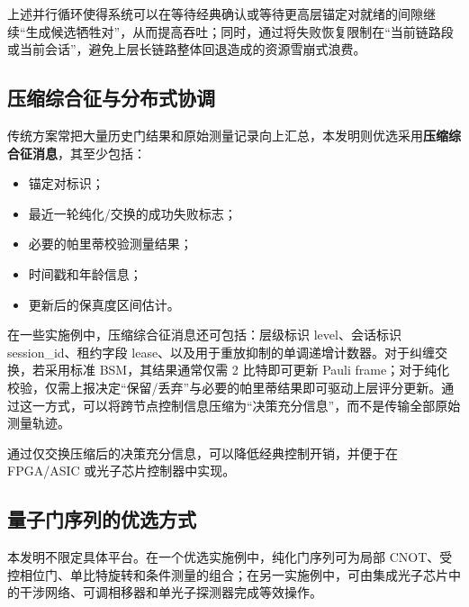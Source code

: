 \documentclass[12pt,a4paper]{article}
\begin{document}
上述并行循环使得系统可以在等待经典确认或等待更高层锚定对就绪的间隙继续“生成候选牺牲对”，从而提高吞吐；同时，通过将失败恢复限制在“当前链路段或当前会话”，避免上层长链路整体回退造成的资源雪崩式浪费。

\subsection{压缩综合征与分布式协调}

传统方案常把大量历史门结果和原始测量记录向上汇总，本发明则优选采用\textbf{压缩综合征消息}，其至少包括：
\begin{itemize}[noitemsep]
    \item 锚定对标识；
    \item 最近一轮纯化/交换的成功失败标志；
    \item 必要的帕里蒂校验测量结果；
    \item 时间戳和年龄信息；
    \item 更新后的保真度区间估计。
\end{itemize}

在一些实施例中，压缩综合征消息还可包括：层级标识 level、会话标识 session\_id、租约字段 lease、以及用于重放抑制的单调递增计数器。对于纠缠交换，若采用标准 BSM，其结果通常仅需 2 比特即可更新 Pauli frame；对于纯化校验，仅需上报决定“保留/丢弃”与必要的帕里蒂结果即可驱动上层评分更新。通过这一方式，可以将跨节点控制信息压缩为“决策充分信息”，而不是传输全部原始测量轨迹。

通过仅交换压缩后的决策充分信息，可以降低经典控制开销，并便于在 FPGA/ASIC 或光子芯片控制器中实现。

\subsection{量子门序列的优选方式}

本发明不限定具体平台。在一个优选实施例中，纯化门序列可为局部 CNOT、受控相位门、单比特旋转和条件测量的组合；在另一实施例中，可由集成光子芯片中的干涉网络、可调相移器和单光子探测器完成等效操作。
\end{document}
